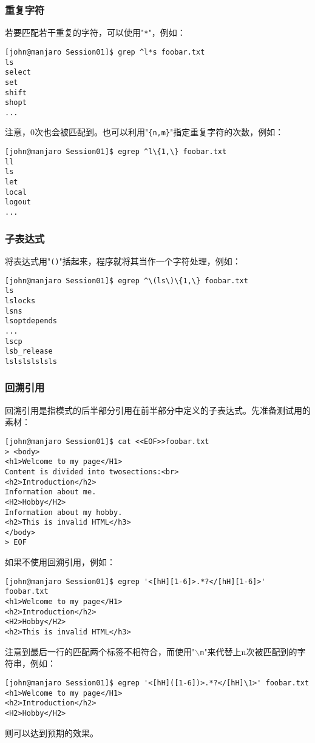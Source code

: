 \subsubsection{重复字符}
若要匹配若干重复的字符，可以使用"\texttt{*}"，例如：
\begin{lstlisting}[frame=none]
[john@manjaro Session01]$ grep ^l*s foobar.txt 
ls
select
set
shift
shopt
...
\end{lstlisting}
注意，0次也会被匹配到。也可以利用"\texttt{\{n,m\}}"指定重复字符的次数，例如：
\begin{lstlisting}[frame=none]
[john@manjaro Session01]$ egrep ^l\{1,\} foobar.txt 
ll
ls
let
local
logout
...
\end{lstlisting}
\subsubsection{子表达式}
将表达式用"\texttt{()}"括起来，程序就将其当作一个字符处理，例如：
\begin{lstlisting}[frame=none]
[john@manjaro Session01]$ egrep ^\(ls\)\{1,\} foobar.txt 
ls
lslocks
lsns
lsoptdepends
...
lscp
lsb_release
lslslslslsls
\end{lstlisting}
\subsubsection{回溯引用}
回溯引用是指模式的后半部分引用在前半部分中定义的子表达式。先准备测试用的素材：
\begin{lstlisting}[frame=none]
[john@manjaro Session01]$ cat <<EOF>>foobar.txt 
> <body>
<h1>Welcome to my page</H1>
Content is divided into twosections:<br>
<h2>Introduction</h2>
Information about me.
<H2>Hobby</H2>
Information about my hobby.
<h2>This is invalid HTML</h3>
</body>
> EOF
\end{lstlisting}
如果不使用回溯引用，例如：
\begin{lstlisting}[frame=none]
[john@manjaro Session01]$ egrep '<[hH][1-6]>.*?</[hH][1-6]>' foobar.txt 
<h1>Welcome to my page</H1>
<h2>Introduction</h2>
<H2>Hobby</H2>
<h2>This is invalid HTML</h3>
\end{lstlisting}
注意到最后一行的匹配两个标签不相符合，而使用"\texttt{$\backslash$n}"来代替上n次被匹配到的字符串，例如：
\begin{lstlisting}[frame=none]
[john@manjaro Session01]$ egrep '<[hH]([1-6])>.*?</[hH]\1>' foobar.txt 
<h1>Welcome to my page</H1>
<h2>Introduction</h2>
<H2>Hobby</H2>
\end{lstlisting}
则可以达到预期的效果。
